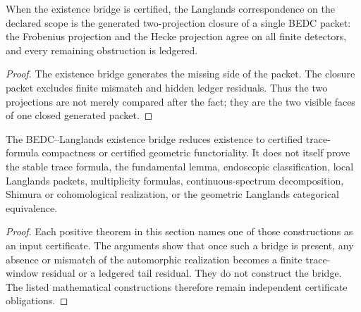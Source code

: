 \begin{corollary}
\label{cor:unified-reality-langlands-generated-two-projection-closure}
When the existence bridge is certified, the Langlands correspondence on
the declared scope is the generated two-projection closure of a single
BEDC packet: the Frobenius projection and the Hecke projection agree on
all finite detectors, and every remaining obstruction is ledgered.
\end{corollary}
\begin{proof}
The existence bridge generates the missing side of the packet. The
closure packet excludes finite mismatch and hidden ledger residuals.
Thus the two projections are not merely compared after the fact; they
are the two visible faces of one closed generated packet.
\end{proof}

\begin{theorem}
\label{thm:unified-reality-langlands-existence-bridge-boundary}
The BEDC--Langlands existence bridge reduces existence to certified
trace-formula compactness or certified geometric functoriality. It does
not itself prove the stable trace formula, the fundamental lemma,
endoscopic classification, local Langlands packets, multiplicity
formulas, continuous-spectrum decomposition, Shimura or cohomological
realization, or the geometric Langlands categorical equivalence.
\end{theorem}
\begin{proof}
Each positive theorem in this section names one of those constructions
as an input certificate. The arguments show that once such a bridge is
present, any absence or mismatch of the automorphic realization becomes
a finite trace-window residual or a ledgered tail residual. They do not
construct the bridge. The listed mathematical constructions therefore
remain independent certificate obligations.
\end{proof}
